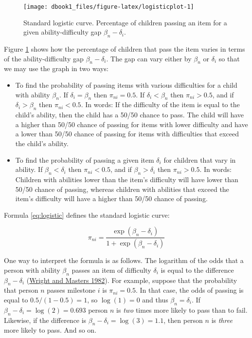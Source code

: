 \documentclass[
]{book}
\begin{document}
\begin{figure}

{\centering \texttt{[image: dbook1\_files/figure-latex/logisticplot-1]} 

}

\caption{Standard logistic curve. Percentage of children passing an item for a given ability-difficulty gap \(\beta_n - \delta_i\).}\label{fig:logisticplot}
\end{figure}



Figure \ref{fig:logisticplot} shows how the percentage of children that pass the item varies in terms of the ability-difficulty gap \(\beta_n - \delta_i\). The gap can vary either by \(\beta_n\) or \(\delta_i\) so that we may use the graph in two ways:

\begin{itemize}
\item
  To find the probability of passing items with various difficulties for a child with ability \(\beta_n\). If \(\delta_i = \beta_n\) then \(\pi_{ni} = 0.5\). If \(\delta_i < \beta_n\) then \(\pi_{ni} > 0.5\), and if \(\delta_i > \beta_n\) then \(\pi_{ni} < 0.5\). In words: If the difficulty of the item is equal to the child's ability, then the child has a 50/50 chance to pass. The child will have a higher than 50/50 chance of passing for items with lower difficulty and have a lower than 50/50 chance of passing for items with difficulties that exceed the child's ability.
\item
  To find the probability of passing a given item \(\delta_i\) for children that vary in ability. If \(\beta_n < \delta_i\) then \(\pi_{ni} < 0.5\), and if \(\beta_n > \delta_i\) then \(\pi_{ni} > 0.5\). In words: Children with abilities lower than the item's difficulty will have lower than 50/50 chance of passing, whereas children with abilities that exceed the item's difficulty will have a higher than 50/50 chance of passing.
\end{itemize}

Formula \eqref{eq:logistic} defines the standard logistic curve:

\begin{equation}
\pi_{ni} = \frac{\exp(\beta_n - \delta_i)}{1+\exp(\beta_n -\delta_i)} \label{eq:logistic}
\end{equation}

One way to interpret the formula is as follows. The logarithm of the odds that a person with ability \(\beta_n\) passes an item of difficulty \(\delta_i\) is equal to the difference \(\beta_n-\delta_i\) (\protect\hyperlink{ref-wright1982}{Wright and Masters 1982}). For example, suppose that the probability that person \(n\) passes milestone \(i\) is \(\pi_{ni} = 0.5\). In that case, the odds of passing is equal to \(0.5 / (1-0.5) = 1\), so \(\log(1) = 0\) and thus \(\beta_n = \delta_i\). If \(\beta_n - \delta_i = \log(2) = 0.693\) person \(n\) is \emph{two} times more likely to pass than to fail. Likewise, if the difference is \(\beta_n - \delta_i = \log(3) = 1.1\), then person \(n\) is \emph{three} more likely to pass. And so on.
\end{document}
